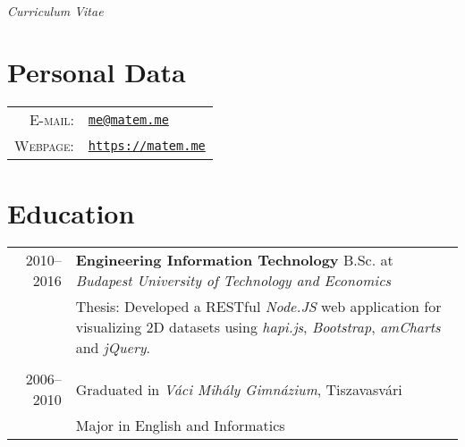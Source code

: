 \documentclass[a4paper,10pt]{article} %
\begin{document}
\pagestyle{empty} %


\par{}\\ \emph{Curriculum Vitae}\bigskip


\section{Personal Data}
\begin{tabular}{rl}
\textsc{E-mail:} & \href{mailto:me@matem.me}{\texttt{me@matem.me}} \\
\textsc{Webpage:} & \href{https://matem.me}{\texttt{https://matem.me}}
\end{tabular}


\section{Education}
\begin{tabular}{r|p{12.5cm}}
\textsc{2010--2016} & \textbf{Engineering Information Technology} B.Sc. at \emph{Budapest University of Technology and Economics}\\
& \footnotesize{Thesis: } Developed a RESTful \emph{Node.JS} web application for visualizing 2D datasets using \emph{hapi.js}, \emph{Bootstrap}, \emph{amCharts}  and \emph{jQuery}.\\
\multicolumn{2}{c}{} \\
\textsc{2006--2010} & Graduated in \emph{Váci Mihály Gimnázium}, Tiszavasvári \\
& \footnotesize{Major in English and Informatics}\\
\end{tabular}
\end{document}
